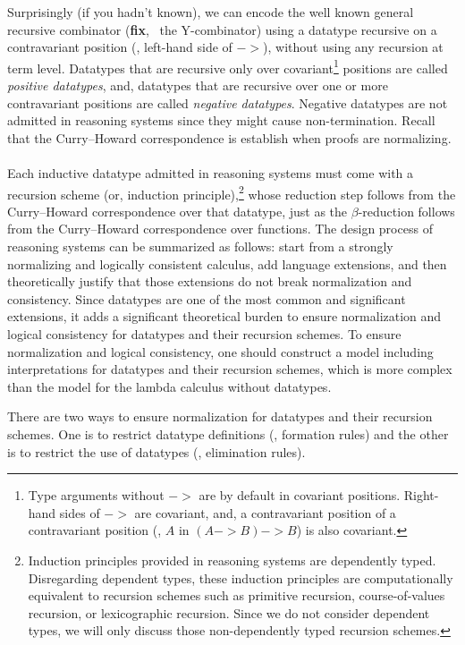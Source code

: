 Surprisingly (if you hadn't known), we can encode the well known
general recursive combinator (\textbf{fix}, \aka\ the \textsf{Y}-combinator)
using a datatype recursive on a contravariant position (\ie, left-hand side of
$->$), without using any recursion at term level.
Datatypes that are recursive only over covariant\footnote{Type arguments
	without $->$ are by default in covariant positions. Right-hand sides
	of $->$ are covariant, and, a contravariant position of
	a contravariant position (\eg, $A$ in $(A -> B) -> B$) is
	also covariant.}
positions are called \emph{positive datatypes}, and, datatypes
that are recursive over one or more contravariant positions are
called \emph{negative datatypes}. Negative datatypes are not admitted
in reasoning systems since they might cause non-termination. Recall that
the Curry--Howard correspondence is establish when proofs are normalizing.

\paragraph{}
Each inductive datatype admitted in reasoning systems must come with
a recursion scheme (or, induction principle),\footnote{
	Induction principles provided in reasoning systems are
	dependently typed. Disregarding dependent types, these
	induction principles are computationally equivalent to
	recursion schemes such as primitive recursion,
	course-of-values recursion, or lexicographic recursion.
	Since we do not consider dependent types, we will only discuss
	those non-dependently typed recursion schemes.}
whose reduction step follows from the Curry--Howard correspondence
over that datatype, just as the $\beta$-reduction follows from
the Curry--Howard correspondence over functions. The design process
of reasoning systems can be summarized as follows: 
start from a strongly normalizing and logically consistent calculus,
add language extensions, and then theoretically justify that those extensions
do not break normalization and consistency. Since datatypes are one of the most
common and significant extensions, it adds a significant theoretical burden to
ensure normalization and logical consistency for datatypes and their recursion
schemes. To ensure normalization and logical consistency, one should construct
a model including interpretations for datatypes and their recursion schemes,
which is more complex than the model for the lambda calculus without datatypes.

There are two ways to ensure normalization for datatypes and their recursion
schemes. One is to restrict datatype definitions (\ie, formation rules) and
the other is to restrict the use of datatypes (\ie, elimination rules).

